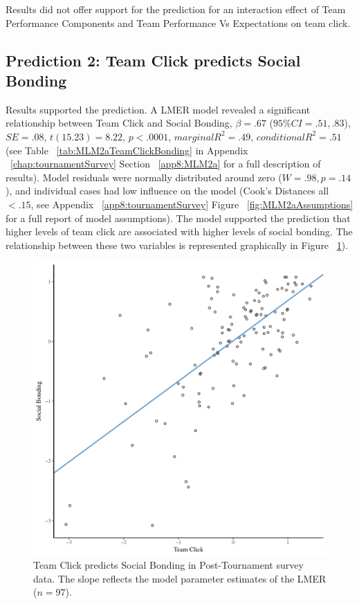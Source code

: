 \begin{CJK}{UTF8}{gbsn}
Results did not offer support for the prediction for an interaction effect of Team Performance Components and Team Performance Vs Expectations on team click.






\subsection{Prediction 2: Team Click predicts Social Bonding}


 Results supported the prediction.  A LMER model revealed a significant relationship between Team Click and Social Bonding, $\beta = .67$ ($95\% CI =  .51, .83$), $SE = .08$, $t(15.23) = 8.22$, $p < .0001$, $marginal R^2 = .49$, $conditional R^2 = .51$ (see Table ~\ref{tab:MLM2aTeamClickBonding} in Appendix ~\ref{chap:tournamentSurvey} Section ~\ref{app8:MLM2a} for a full description of results).  Model residuals were normally distributed around zero ($W = .98, p = .14$), and individual cases had low influence on the model (Cook's Distances all $< .15$, see Appendix ~\ref{app8:tournamentSurvey} Figure ~\ref{fig:MLM2aAssumptions} for a full report of model assumptions).  The model supported the prediction that higher levels of team click are associated with higher levels of social bonding.  The relationship between these two variables is represented graphically in Figure ~\ref{fig:clickBondModelSlope}).

  \begin{figure}[htbp]
    \centering
  \includegraphics[scale=.5]{images/clickBondModelSlope.pdf}
    \caption{Team Click predicts Social Bonding in Post-Tournament survey data. The slope reflects the model parameter estimates of the LMER ($n = 97$).}
    \label{fig:clickBondModelSlope}
  \end{figure}




\end{CJK}
